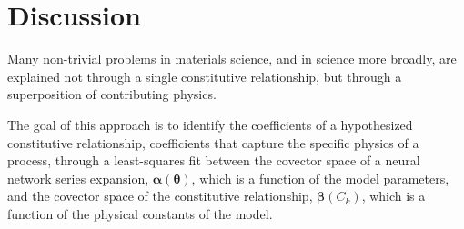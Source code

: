 \section{Discussion}\label{discussion}

Many non-trivial problems in materials science, and in science more broadly, are explained not through a single constitutive relationship, but through a superposition of contributing physics.

%
%

The goal of this approach is to identify the coefficients of a hypothesized constitutive relationship, coefficients that capture the specific physics of a process, through a least-squares fit between the covector space of a neural network series expansion, $\boldsymbol{\alpha}(\boldsymbol{\theta})$, which is a function of the model parameters, and the covector space of the constitutive relationship, $\boldsymbol{\beta}(C_k)$, which is a function of the physical constants of the model.

